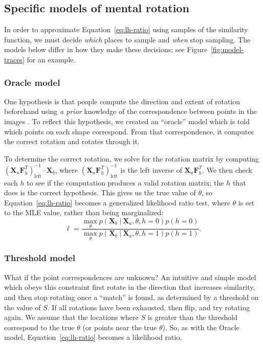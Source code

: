 \documentclass[10pt,letterpaper]{article}
\newcommand{\Xa}[0]{\mathbf{X}_a}
\newcommand{\Xb}[0]{\mathbf{X}_b}
\newcommand{\F}[0]{\mathbf{F}}
\newcommand{\hi}[0]{h=0}
\newcommand{\hf}[0]{h=1}
\newcommand{\Oc}[0]{Oracle}
\begin{document}
\subsection{Specific models of mental rotation}

In order to approximate Equation~\ref{eq:lh-ratio} using samples of
the similarity function, we must decide \textit{which} places to
sample and \textit{when} stop sampling. The models below differ in how
they make these decisions; see Figure~\ref{fig:model-traces} for an
example.

\subsubsection{Oracle model}

One hypothesis is that people compute the direction and extent of
rotation beforehand using \textit{a prior} knowledge of the
correspondence between points in the images
\cite{Funt:1983wn,Just:1985uu}.  To reflect this hypothesis, we
created an ``oracle'' model which is told which points on each shape
correspond. From that correspondence, it computes the correct rotation
and rotates through it.

To determine the correct rotation, we solve for the rotation matrix by
computing $(\Xa \F_h^T)_\mathrm{left}^{-1}\cdot{}\Xb$, where
$(\Xa\F_h^T)_\mathrm{left}^{-1}$ is the left inverse of
$\Xa\F_h^T$. We then check each $h$ to see if the computation produces
a valid rotation matrix; the $h$ that does is the correct
hypothesis. This gives us the true value of $\theta$, so
Equation~\ref{eq:lh-ratio} becomes a generalized likelihood ratio
test, where $\theta$ is set to the MLE value, rather than being
marginalized:
\begin{equation}
  \ell = \frac{\max_\theta p(\Xb\ \vert\ \Xa, \theta, \hi)p(\hi)}{\max_\theta p(\Xb\ \vert\ \Xa, \theta, \hf)p(\hf)}.
  \label{eq:mle-lh-ratio}
\end{equation}

\subsubsection{Threshold model}

What if the point correspondences are unknown? An intuitive and simple
model which obeys this constraint first rotate in the direction that
increases similarity, and then stop rotating once a ``match'' is
found, as determined by a threshold on the value of $S$. If all
rotations have been exhausted, then flip, and try rotating again. We
assume that the locations where $S$ is greater than the threshold
correspond to the true $\theta$ (or points near the true
$\theta$). So, as with the \Oc{} model, Equation~\ref{eq:lh-ratio}
becomes a likelihood ratio.
\end{document}
